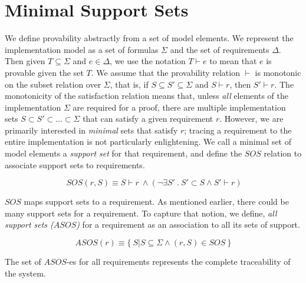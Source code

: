 
\section{Minimal Support Sets}
\label{sec:motivation}
\newcommand{\satisfies}{\vdash_{\!\!s}}
\newcommand{\nsatisfies}{\nvdash_{\!\!s}}

We define provability abstractly from a set of model elements.  We represent the implementation model as a set of formulas $\Sigma$  and the set of requirements $\Delta$.  Then given $T \subseteq \Sigma$ and $e \in \Delta$, we use the notation $T \vdash e$ to mean that $e$ is provable given the set $T$.  We assume that the provability relation $\vdash$ is monotonic on the subset relation over $\Sigma$, that is, if $S \subseteq S' \subseteq \Sigma$ and $S \vdash r$, then $S' \vdash r$.  The monotonicity of the satisfaction relation means that, unless {\em all} elements of the implementation $\Sigma$ are required for a proof, there are multiple implementation sets $S \subset S' \subset \ldots \subset \Sigma$ that can satisfy a given requirement $r$.  However, we are primarily interested in {\em minimal} sets that satisfy $r$; tracing a requirement to the entire implementation is not particularly enlightening.  We call a minimal set of model elements a \emph{support set} for that requirement, and define the $SOS$ relation to associate support sets to requirements.

$$ \ SOS(r, S) \equiv S \vdash r~ \land   (\neg\exists S'\ .\ S' \subset S \wedge S' \vdash r) $$

$SOS$ maps support sets to a requirement. As mentioned earlier, there could be many support sets for a requirement. To capture that notion, we define, \emph{all support sets ($ASOS$)} for a requirement as an association to all its sets of support.


$$ ASOS(r) \equiv  \{\ S | S \subseteq \Sigma \land (r,S) \in SOS\ \} $$

The set of $ASOS$-es for all requirements represents the complete traceability of the system.

